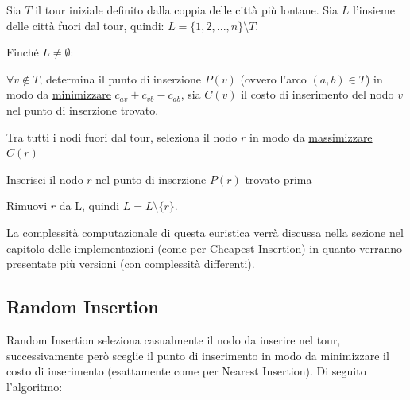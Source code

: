 \documentclass[a4paper,12pt]{report}
\begin{document}
\begin{tcolorbox}[colframe=black,colback=white,boxrule=0.5pt, sharp corners, breakable]
\begin{legal}
  \item Sia $T$ il tour iniziale definito dalla coppia delle città più lontane. Sia $L$ l'insieme delle città fuori dal tour, quindi: $L = \{1, 2, ..., n\} \setminus T$.
  \item Finché $L \neq \emptyset$:
  \begin{legal}
    \item $\forall v \not \in T$, determina il punto di inserzione $P(v)$ (ovvero l'arco $(a, b) \in T$) in modo da \underline{minimizzare} $c_{av} + c_{vb} - c_{ab}$, sia $C(v)$ il costo di inserimento del nodo $v$ nel punto di inserzione trovato.
    \item Tra tutti i nodi fuori dal tour, seleziona il nodo $r$ in modo da \underline{massimizzare} $C(r)$
    \item Inserisci il nodo $r$ nel punto di inserzione $P(r)$ trovato prima
    \item Rimuovi $r$ da L, quindi $L = L \setminus \{r\}$.
  \end{legal}
\end{legal}
\end{tcolorbox}
\hfill \break La complessità computazionale di questa euristica verrà discussa nella sezione nel capitolo delle implementazioni (come per Cheapest Insertion) in quanto verranno presentate più versioni (con complessità differenti).

\subsection{Random Insertion} \label{ssec:RI}
Random Insertion seleziona casualmente il nodo da inserire nel tour, successivamente però sceglie il punto di inserimento in modo da minimizzare il costo di inserimento (esattamente come per Nearest Insertion). Di seguito l'algoritmo:
\end{document}
